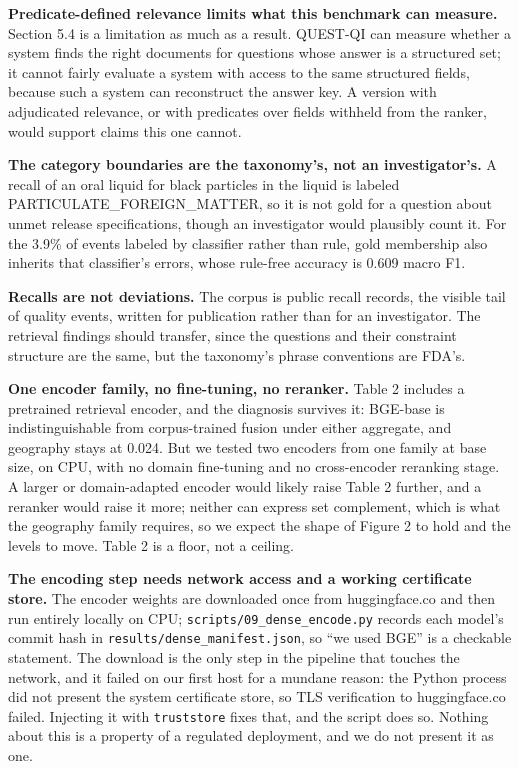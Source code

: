 \documentclass[acmsmall]{acmart}
\begin{document}
\textbf{Predicate-defined relevance limits what this benchmark can measure.} Section 5.4 is a limitation as much as a result. QUEST-QI can measure whether a system finds the right documents for questions whose answer is a structured set; it cannot fairly evaluate a system with access to the same structured fields, because such a system can reconstruct the answer key. A version with adjudicated relevance, or with predicates over fields withheld from the ranker, would support claims this one cannot.

\textbf{The category boundaries are the taxonomy's, not an investigator's.} A recall of an oral liquid for black particles in the liquid is labeled PARTICULATE\_FOREIGN\_MATTER, so it is not gold for a question about unmet release specifications, though an investigator would plausibly count it. For the 3.9\% of events labeled by classifier rather than rule, gold membership also inherits that classifier's errors, whose rule-free accuracy is 0.609 macro F1.

\textbf{Recalls are not deviations.} The corpus is public recall records, the visible tail of quality events, written for publication rather than for an investigator. The retrieval findings should transfer, since the questions and their constraint structure are the same, but the taxonomy's phrase conventions are FDA's.

\textbf{One encoder family, no fine-tuning, no reranker.} Table 2 includes a pretrained retrieval encoder, and the diagnosis survives it: BGE-base is indistinguishable from corpus-trained fusion under either aggregate, and geography stays at 0.024. But we tested two encoders from one family at base size, on CPU, with no domain fine-tuning and no cross-encoder reranking stage. A larger or domain-adapted encoder would likely raise Table 2 further, and a reranker would raise it more; neither can express set complement, which is what the geography family requires, so we expect the shape of Figure 2 to hold and the levels to move. Table 2 is a floor, not a ceiling.

\textbf{The encoding step needs network access and a working certificate store.} The encoder weights are downloaded once from huggingface.co and then run entirely locally on CPU; \texttt{scripts/09\_\allowbreak{}dense\_\allowbreak{}encode.py} records each model's commit hash in \texttt{results/dense\_\allowbreak{}manifest.json}, so ``we used BGE'' is a checkable statement. The download is the only step in the pipeline that touches the network, and it failed on our first host for a mundane reason: the Python process did not present the system certificate store, so TLS verification to huggingface.co failed. Injecting it with \texttt{truststore} fixes that, and the script does so. Nothing about this is a property of a regulated deployment, and we do not present it as one.
\end{document}

